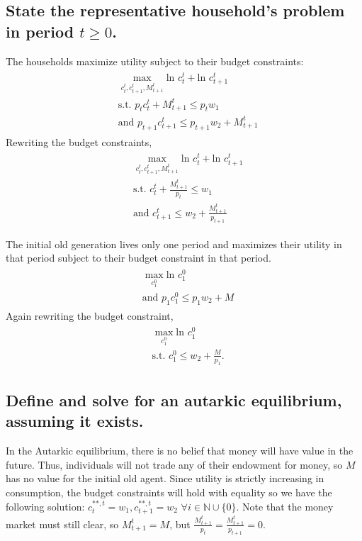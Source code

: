 \documentclass[11pt]{article} %
\begin{document}
\subsection{State the representative household's problem in period $t \geq 0$.}
The households maximize utility subject to their budget constraints:
\begin{align*}
\begin{split}
&\max_{c_{t}^{t},c_{t+1}^{t},M_{t+1}^t} \text{ln } c_{t}^{t} + \text{ln } c_{t+1}^{t}\\ 
&\text{s.t. } p_t c_{t}^{t} + M_{t+1}^{t} \leq p_t w_1 \\
&\text{and } p_{t+1} c_{t+1}^{t} \leq p_{t+1} w_2 + M_{t+1}^{t}
\end{split}
\end{align*}
Rewriting the budget constraints,
\begin{align}
\begin{split}
&\max_{c_{t}^{t},c_{t+1}^{t},M_{t+1}^t} \text{ln } c_{t}^{t} + \text{ln } c_{t+1}^{t}\\  \label{eqn:hh}
&\text{s.t. } c_{t}^{t} + \frac{M_{t+1}^{t}}{p_t} \leq w_1 \\
&\text{and }  c_{t+1}^{t} \leq w_2 + \frac{M_{t+1}^{t}}{p_{t+1}}
\end{split}
\end{align}


The initial old generation
 lives only one period and maximizes their utility in that period subject to their budget constraint in that period.
\begin{align*}
\begin{split}
&\max_{c_{1}^{0}} \text{ln } c_{1}^{0}\\ 
&\text{and } p_{1} c_{1}^{0} \leq p_{1} w_2 + M
\end{split}
\end{align*}
Again rewriting the budget constraint,
\begin{align*}
\begin{split}
&\max_{c_{1}^{0}} \text{ln } c_{1}^{0}\\ 
&\text{s.t. } c_{1}^{0} \leq w_2 + \frac{M}{p_1}.
\end{split}
\end{align*}

\subsection{Define and solve for an autarkic equilibrium, assuming it exists.} %
In the Autarkic equilibrium, there is no belief that money will have value in the future. Thus, individuals will not trade any of their endowment for money, so  $M$ has no value for the initial old agent. Since utility is strictly increasing in consumption, the budget constraints will hold with equality so we have the following solution: $c_t^{**,t} = w_1, c_{t+1}^{**,t} = w_2$ $\forall i \in \mathbb{N} \cup \{0\}.$ Note that the money market must still clear, so $M_{t+1}^t = M$, but $\frac{M_{t+1}^t}{p_{t}} = \frac{M_{t+1}^t}{p_{t+1}} = 0.$
\end{document}
